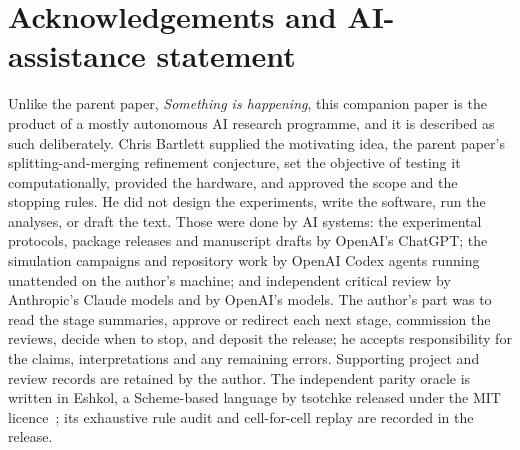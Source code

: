 \documentclass[11pt,a4paper]{article}
\begin{document}
\section*{Acknowledgements and AI-assistance statement}
Unlike the parent paper, \emph{Something is happening}, this companion paper is the product of a mostly autonomous AI research programme, and it is described as such deliberately. Chris Bartlett supplied the motivating idea, the parent paper's splitting-and-merging refinement conjecture, set the objective of testing it computationally, provided the hardware, and approved the scope and the stopping rules. He did not design the experiments, write the software, run the analyses, or draft the text. Those were done by AI systems: the experimental protocols, package releases and manuscript drafts by OpenAI's ChatGPT; the simulation campaigns and repository work by OpenAI Codex agents running unattended on the author's machine; and independent critical review by Anthropic's Claude models and by OpenAI's models. The author's part was to read the stage summaries, approve or redirect each next stage, commission the reviews, decide when to stop, and deposit the release; he accepts responsibility for the claims, interpretations and any remaining errors. Supporting project and review records are retained by the author. The independent parity oracle is written in Eshkol, a Scheme-based language by tsotchke released under the MIT licence~\citep{Tsotchke2026Eshkol}; its exhaustive rule audit and cell-for-cell replay are recorded in the release.




\end{document}
